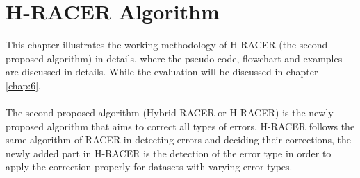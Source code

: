 \documentclass[12pt,openany]{llncs}
\begin{document}
\chapter{\label{chap:5}H-RACER Algorithm}
This chapter illustrates the working methodology of H-RACER (the second proposed algorithm) in details, where the pseudo code, flowchart and examples are discussed in details. While the evaluation will be discussed in chapter \ref{chap:6}.
\\
\\
The second proposed algorithm (Hybrid RACER or H-RACER) \cite{HRACER} is the newly proposed algorithm that aims to correct all types of errors. H-RACER follows the same algorithm of RACER in detecting errors and deciding their corrections, the newly added part in H-RACER is the detection of the error type in order to apply the correction properly for datasets with varying error types.
\end{document}
